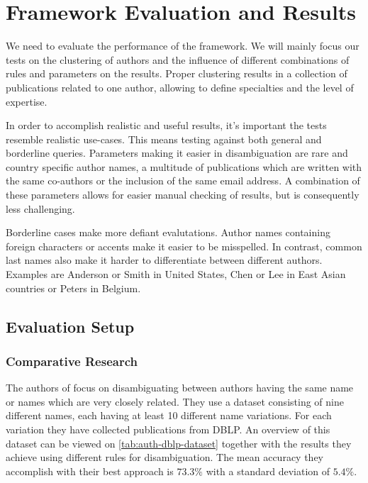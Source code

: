 \chapter{Framework Evaluation and Results}



We need to evaluate the performance of the framework. We will mainly focus our tests on the clustering of authors and the influence of different combinations of rules and parameters on the results. Proper clustering results in a collection of publications related to one author, allowing to define specialties and the level of expertise. 

In order to accomplish realistic and useful results, it's important the tests resemble realistic use-cases. This means testing against both general and borderline queries. Parameters making it easier in disambiguation are rare and country specific author names, a multitude of publications which are written with the same co-authors or the inclusion of the same email address. A combination of these parameters allows for easier manual checking of results, but is consequently less challenging. 

Borderline cases make more defiant evalutations. Author names containing foreign characters or accents make it easier to be misspelled. In contrast, common last names also make it harder to differentiate between different authors. Examples are Anderson or Smith in United States, Chen or Lee in East Asian countries or Peters in Belgium.




\section{Evaluation Setup}

\subsection{Comparative Research}

The authors of \cite{han2004two} focus on disambiguating between authors having the same name or names which are very closely related. They use a dataset consisting of nine different names, each having at least 10 different name variations. For each variation they have collected publications from DBLP. An overview of this dataset can be viewed on \autoref{tab:auth-dblp-dataset} together with the results they achieve using different rules for disambiguation. The mean accuracy they accomplish with their best approach is $73.3\%$ with a standard deviation of $5.4\%$.

